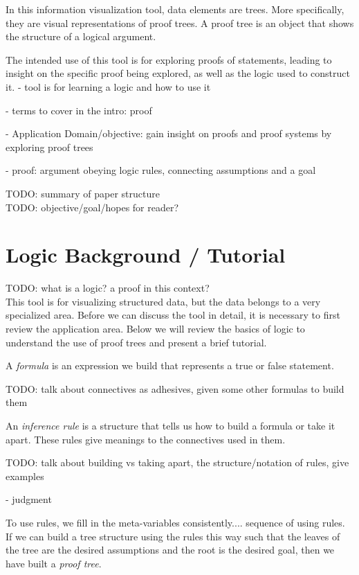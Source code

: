\documentclass[conference]{IEEEtran}
\begin{document}
In this information visualization tool, data elements are trees. More specifically, they are visual representations of proof trees. A proof tree is an object that shows the structure of a logical argument.

The intended use of this tool is for exploring proofs of statements, leading to insight on the specific proof being explored, as well as the logic used to construct it.
- tool is for learning a logic and how to use it

- terms to cover in the intro: proof

- Application Domain/objective: gain insight on proofs and proof systems by exploring proof trees

- proof: argument obeying logic rules, connecting assumptions and a goal

TODO: summary of paper structure \\

TODO: objective/goal/hopes for reader? \\



\section{Logic Background / Tutorial}

TODO: what is a logic? a proof in this context? \\

This tool is for visualizing structured data, but the data belongs to a very specialized area. Before we can discuss the tool in detail, it is necessary to first review the application area. Below we will review the basics of logic to understand the use of proof trees and present a brief tutorial.

A \textit{formula} is an expression we build that represents a true or false statement.

TODO: talk about connectives as adhesives, given some other formulas to build them

An \textit{inference rule} is a structure that tells us how to build a formula or take it apart. These rules give meanings to the connectives used in them.

TODO: talk about building vs taking apart, the structure/notation of rules, give examples

- judgment

To use rules, we fill in the meta-variables consistently.... sequence of using rules. If we can build a tree structure using the rules this way such that the leaves of the tree are the desired assumptions and the root is the desired goal, then we have built a \textit{proof tree}.
\end{document}
